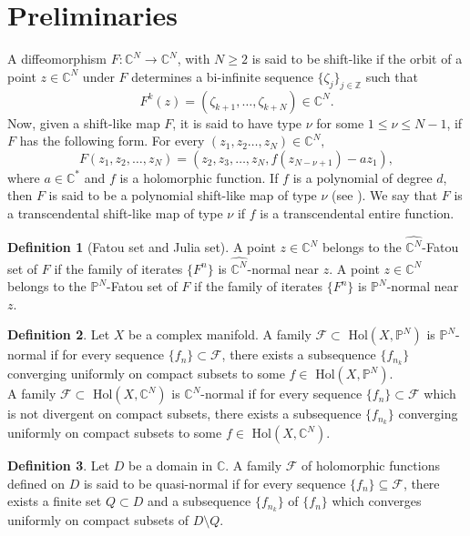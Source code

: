 \documentclass[12pt, reqno]{amsart}
\numberwithin{equation}{section}
\theoremstyle{definition}
\newtheorem{definition}{Definition}[section]
\theoremstyle{remark}
\theoremstyle{plain}
\theoremstyle{definition}
\numberwithin{equation}{section}
\begin{document}
\section{Preliminaries}
A diffeomorphism $F:\mathbb{C}^N\to\mathbb{C}^N$, with $N\geq 2$ is said to be shift-like if the orbit of a point $z\in\mathbb{C}^N$ under $F$ determines a bi-infinite sequence $\{\zeta_j\}_{j\in\mathbb{Z}}$ such that
\[F^k(z)=(\zeta_{k+1},\dots,\zeta_{k+N})\in\mathbb{C}^N. \]
Now, given a shift-like map $F$, it is said to have type $\nu$ for some $1\leq\nu\leq N-1$, if $F$ has the following form. For every $(z_1,z_2\dots,z_N)\in\mathbb{C}^N,$ 
\[F(z_1,z_2,\dots,z_N)=(z_2,z_3,\dots, z_N, f(z_{N-\nu+1})-az_1),\]
where $a\in\mathbb{C}^*$ and $f$ is a holomorphic function.  If  $f$ is a polynomial of degree $d$, then $F$ is said to be a polynomial shift-like map of type $\nu$ (see \cite{Bedford}). We say  that $F$ is a transcendental shift-like map of type $\nu$ if $f$ is a transcendental entire function.

\begin{definition}[Fatou set and Julia set]  \cite[Page 859]{Arosio}
A point $z\in\mathbb{C}^N$ belongs to the $\widehat{\mathbb{C}^N}$-Fatou set of $F$ if the family of iterates $\{F^n\}$ is $\widehat{\mathbb{C}^N}$-normal near $z$. A point $z\in\mathbb{C}^N$ belongs to the $\mathbb{P}^N$-Fatou set of $F$ if the family of iterates $\{F^n\}$ is $\mathbb{P}^N$-normal near $z$.
\end{definition}

\begin{definition}\cite[Page 857]{Arosio}
Let $X$ be a complex manifold. A family $\mathcal{F}\subset$ Hol$(X,\mathbb{P}^N)$ is $\mathbb{P}^N$-normal if for every sequence $\{f_n\}\subset\mathcal{F}$,
there exists a subsequence $\{f_{n_k}\}$ converging uniformly on compact subsets to some $f\in$ Hol$(X,\mathbb{P}^N)$. \\
A family $\mathcal{F}\subset$ Hol$(X,\mathbb{C}^N)$ is $\mathbb{C}^N$-normal if for every sequence $\{f_n\}\subset\mathcal{F}$ which is not
divergent on compact subsets, there exists a subsequence $\{f_{n_k}\}$ converging uniformly on compact subsets to some $f\in$ Hol$(X,\mathbb{C}^N)$.
\end{definition}

\begin{definition}\cite[Page 209]{Schiff}
Let $D$ be a domain in $\mathbb{C}$. A family $\mathcal{F}$ of holomorphic functions defined on $D$ is said to be quasi-normal if for every sequence $\{f_n\}\subseteq \mathcal{F}$, there exists a finite set $Q\subset D$ and a subsequence $\{f_{n_k}\}$ of $\{f_n\}$ which converges uniformly on compact subsets of $D\setminus Q.$
\end{definition}
\end{document}
